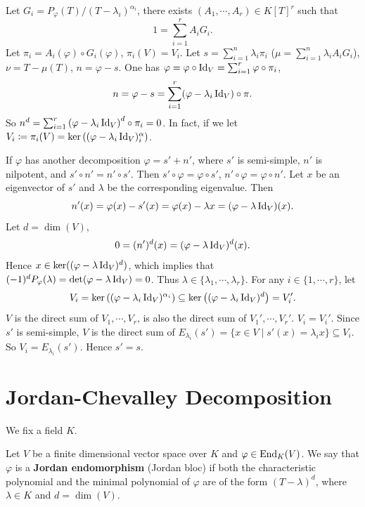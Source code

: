\begin{proofenv}
    Let $G_i = P_{\varphi}(T)/(T - \lambda_i)^{\alpha_i}$,
    there exists $(A_1,\cdots,A_r) \in K[T]^r$ such that
    $$1 = \sum_{i=1}^{r} A_i G_i.$$
    Let $\pi_i = A_i (\varphi) \circ G_i (\varphi)$, $\pi_i (V) = V_i$.
    Let $s = \sum_{i=1}^{n} \lambda_i \pi_i$ ($\mu = \sum_{i=1}^{n}\lambda_i A_i G_i$), $\nu = T - \mu(T)$, $n = \varphi - s$.
    One has $\varphi = \varphi \circ \operatorname{\mathrm{Id}}_{V} = \sum_{i=1}^{r}\varphi \circ \pi_i$,
    $$n = \varphi - s = \sum_{i=1}^{r}(\varphi - \lambda_i \operatorname{\mathrm{Id}}_{V}) \circ \pi.$$
    So $n^d = \sum_{i=1}^{r} \left(\varphi - \lambda_i \operatorname{\mathrm{Id}}_{V}\right)^d \circ \pi_{i} = 0$.
    In fact, if we let $V_i \coloneq \pi_i (V) = \ker\left((\varphi - \lambda_i \operatorname{\mathrm{Id}}_{V})^\alpha_i\right)$.

    \quad If $\varphi$ has another decomposition $\varphi = s' + n'$, where $s'$ is semi-simple, $n'$ is nilpotent, and $s' \circ n' = n' \circ s'$.
    Then $s' \circ \varphi = \varphi \circ s'$, $n' \circ \varphi = \varphi \circ n'$.
    Let $x$ be an eigenvector of $s'$ and $\lambda$ be the corresponding eigenvalue.
    Then
    $$n'(x) = \varphi(x) - s' (x) = \varphi (x) - \lambda x = (\varphi - \lambda \operatorname{\mathrm{Id}}_{V})(x).$$
    Let $d = \dim(V)$,
    $$0 = (n')^d(x) = (\varphi - \lambda \operatorname{\mathrm{Id}}_{V})^d(x).$$
    Hence $x \in \ker((\varphi - \lambda \operatorname{\mathrm{Id}}_{V})^d)$, which implies that $(-1)^d P_{\varphi}(\lambda) = \det(\varphi - \lambda \operatorname{\mathrm{Id}}_{V}) = 0$.
    Thus $\lambda \in \{\lambda_1,\cdots,\lambda_r\}$.
    For any $i \in \{1,\cdots,r\}$, let
    $$V_i = \ker\left((\varphi - \lambda_i \operatorname{\mathrm{Id}}_{V})^{\alpha_i}\right) \subseteq \ker\left((\varphi - \lambda_i \operatorname{\mathrm{Id}}_{V})^{d}\right) = V_i'.$$
    $V$ is the direct sum of $V_1,\cdots,V_r$, is also the direct sum of $V_1',\cdots,V_r'$.
    $V_i = V_i'$.
    Since $s'$ is semi-simple, $V$ is the direct sum of $E_{\lambda_i}(s') = \{x \in V \mid s'(x) = \lambda_i x\} \subseteq V_i$.
    So $V_i = E_{\lambda_i}(s')$.
    Hence $s' = s$.
\end{proofenv}


\section{Jordan-Chevalley Decomposition}


We fix a field $K$.

\begin{definitionenv}
    Let $V$ be a finite dimensional vector space over $K$ and $\varphi \in \operatorname{\mathrm{End}}_{K}(V)$.
    We say that $\varphi$ is a \textbf{Jordan endomorphism} (Jordan bloc) if both the characteristic polynomial and the minimal polynomial of $\varphi$ are of the form $(T - \lambda)^d$,
    where $\lambda \in K$ and $d = \dim(V)$.
\end{definitionenv}

